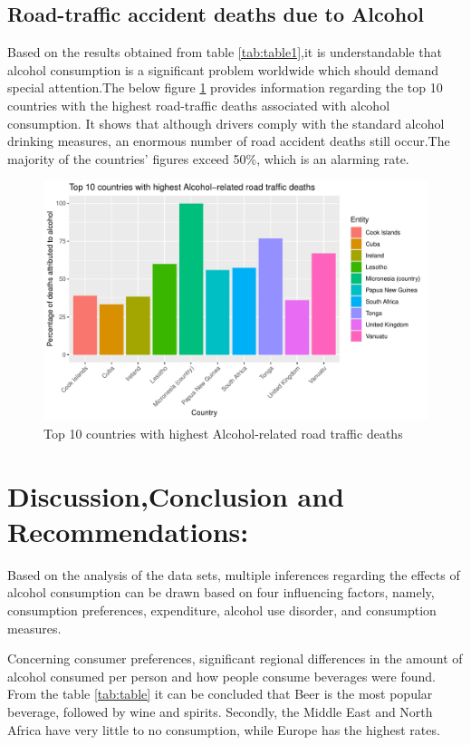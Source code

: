\documentclass[11pt,a4paper,]{article}
\begin{document}
\subsection{Road-traffic accident deaths due to Alcohol}\label{road-traffic-accident-deaths-due-to-alcohol}

Based on the results obtained from table \ref{tab:table1},it is understandable that alcohol consumption is a significant problem worldwide which should demand special attention.The below figure \ref{fig:figure2} provides information regarding the top 10 countries with the highest road-traffic deaths associated with alcohol consumption.
It shows that although drivers comply with the standard alcohol drinking measures, an enormous number of road accident deaths still occur.The majority of the countries' figures exceed 50\%, which is an alarming rate.

\begin{figure}

{\centering \includegraphics[width=0.7\linewidth]{alcohol_analysis_files/figure-latex/figure2-1} 

}

\caption{Top 10 countries with highest Alcohol-related road traffic deaths}\label{fig:figure2}
\end{figure}

\section{Discussion,Conclusion and Recommendations:}\label{discussionconclusion-and-recommendations}

Based on the analysis of the data sets, multiple inferences regarding the effects of alcohol consumption can be drawn based on four influencing factors, namely, consumption preferences, expenditure, alcohol use disorder, and consumption measures.

Concerning consumer preferences, significant regional differences in the amount of alcohol consumed per person and how people consume beverages were found. From the table \ref{tab:table} it can be concluded that Beer is the most popular beverage, followed by wine and spirits. Secondly, the Middle East and North Africa have very little to no consumption, while Europe has the highest rates.
\end{document}
